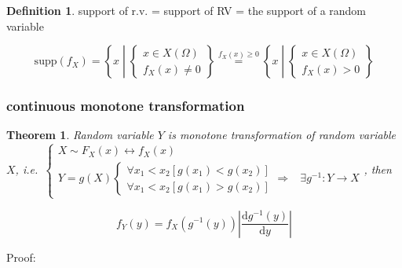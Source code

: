 \documentclass[
]{book}
\newtheorem{theorem}{Theorem}[chapter]
\theoremstyle{definition}
\newtheorem{definition}{Definition}[chapter]
\theoremstyle{definition}
\theoremstyle{definition}
\theoremstyle{definition}
\theoremstyle{remark}
\begin{document}
\begin{definition}
\protect\hypertarget{def:unnamed-chunk-14}{}\label{def:unnamed-chunk-14}support of r.v. = support of RV = the support of a random variable
\end{definition}

\[
\mathrm{supp}\left(f_{{\scriptscriptstyle X}}\right)=\left\{ x\middle|\begin{cases}
x\in X\left(\Omega\right)\\
f_{{\scriptscriptstyle X}}\left(x\right)\ne0
\end{cases}\right\} \overset{f_{{\scriptscriptstyle X}}\left(x\right)\ge0}{=}\left\{ x\middle|\begin{cases}
x\in X\left(\Omega\right)\\
f_{{\scriptscriptstyle X}}\left(x\right)>0
\end{cases}\right\} 
\]

\hypertarget{continuous-monotone-transformation}{%
\subsubsection{continuous monotone transformation}\label{continuous-monotone-transformation}}

\begin{theorem}
\protect\hypertarget{thm:unnamed-chunk-15}{}\label{thm:unnamed-chunk-15}Random variable \(Y\) is monotone transformation of random variable \(X\), i.e.~\(\begin{cases} X\sim F_{{\scriptscriptstyle X}}\left(x\right)\leftrightarrow f_{{\scriptscriptstyle X}}\left(x\right)\\ Y=g\left(X\right)\begin{cases} \forall x_{{\scriptscriptstyle 1}}<x_{{\scriptscriptstyle 2}}\left[g\left(x_{{\scriptscriptstyle 1}}\right)<g\left(x_{{\scriptscriptstyle 2}}\right)\right]\\ \forall x_{{\scriptscriptstyle 1}}<x_{{\scriptscriptstyle 2}}\left[g\left(x_{{\scriptscriptstyle 1}}\right)>g\left(x_{{\scriptscriptstyle 2}}\right)\right] \end{cases}\Rightarrow & \exists g^{-1}:Y\rightarrow X \end{cases}\), then
\end{theorem}

\[
f_{{\scriptscriptstyle Y}}\left(y\right)=f_{{\scriptscriptstyle X}}\left(g^{-1}\left(y\right)\right)\left|\dfrac{\mathrm{d}g^{-1}\left(y\right)}{\mathrm{d}y}\right|
\]

Proof:
\end{document}
